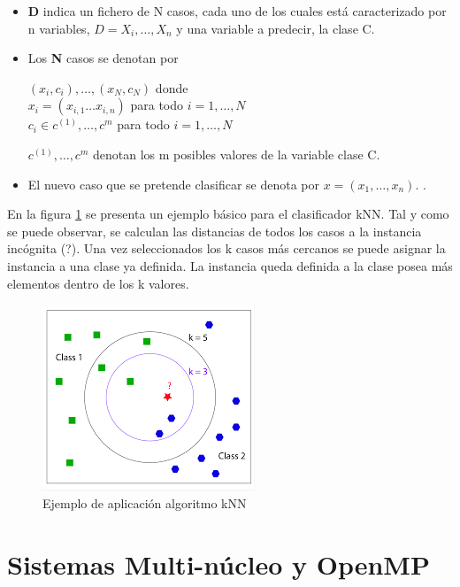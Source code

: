 \begin{itemize}

\item \textbf{D} indica un fichero de N casos, cada uno de los cuales está caracterizado por n variables, $D = X_i, \dots, X_n$ y una variable a predecir, la clase C.
\item Los \textbf{N} casos se denotan por\
\begin{center}
$(x_i,c_i),\dots,(x_N,c_N)$ donde\\
$x_i = (x_{i,1} \dots x_{i,n})$ para todo $i = 1,\dots,N$\\
$c_i \in {c^(1), \dots, c^{m}}$ para todo $i = 1,\dots,N$\\
\end{center}


$c^(1), \dots, c^{m}$ denotan los m posibles valores de la variable clase C.
\item El nuevo caso que se pretende clasificar se denota por $x = (x_1, \dots , x_n)$.
\cite[pag. 1]{moujahidtema}.
\end{itemize}

En la figura \ref{fig:knnejem} se presenta un ejemplo básico para el clasificador kNN. Tal y como se puede observar, se calculan las distancias de todos los casos a la instancia incógnita (?). Una vez seleccionados los k casos más cercanos se puede asignar la instancia a una clase ya definida. La instancia queda definida a la clase posea más elementos dentro de los k valores. 

\begin{figure}
\begin{center}
   \includegraphics[scale=0.7]{fig/knn_ejemplo.png} 
\end{center}
\caption{\label{fig:knnejem}Ejemplo de aplicación algoritmo kNN}
\end{figure}

\section{Sistemas Multi-núcleo y OpenMP}

